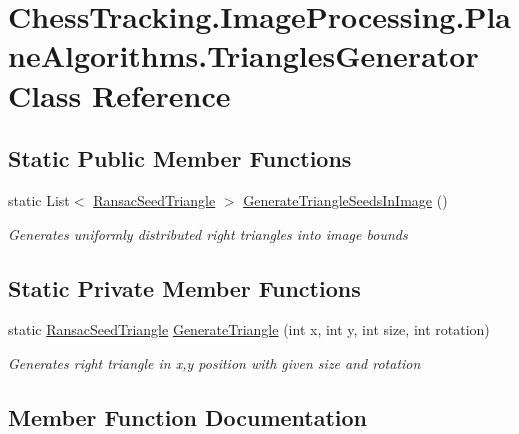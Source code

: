 \hypertarget{class_chess_tracking_1_1_image_processing_1_1_plane_algorithms_1_1_triangles_generator}{}\section{Chess\+Tracking.\+Image\+Processing.\+Plane\+Algorithms.\+Triangles\+Generator Class Reference}
\label{class_chess_tracking_1_1_image_processing_1_1_plane_algorithms_1_1_triangles_generator}
\subsection*{Static Public Member Functions}
\begin{DoxyCompactItemize}
\item 
static List$<$ \mbox{\hyperlink{class_chess_tracking_1_1_image_processing_1_1_plane_algorithms_1_1_ransac_seed_triangle}{Ransac\+Seed\+Triangle}} $>$ \mbox{\hyperlink{class_chess_tracking_1_1_image_processing_1_1_plane_algorithms_1_1_triangles_generator_ad775d166a286ff617c5ab4e3ce96e688}{Generate\+Triangle\+Seeds\+In\+Image}} ()
\begin{DoxyCompactList}\small\item\em Generates uniformly distributed right triangles into image bounds \end{DoxyCompactList}\end{DoxyCompactItemize}
\subsection*{Static Private Member Functions}
\begin{DoxyCompactItemize}
\item 
static \mbox{\hyperlink{class_chess_tracking_1_1_image_processing_1_1_plane_algorithms_1_1_ransac_seed_triangle}{Ransac\+Seed\+Triangle}} \mbox{\hyperlink{class_chess_tracking_1_1_image_processing_1_1_plane_algorithms_1_1_triangles_generator_af9b91c5c6a2df22636cf9c10b4d73303}{Generate\+Triangle}} (int x, int y, int size, int rotation)
\begin{DoxyCompactList}\small\item\em Generates right triangle in x,y position with given size and rotation \end{DoxyCompactList}\end{DoxyCompactItemize}


\subsection{Member Function Documentation}
\mbox{\label{class_chess_tracking_1_1_image_processing_1_1_plane_algorithms_1_1_triangles_generator_af9b91c5c6a2df22636cf9c10b4d73303}} 
